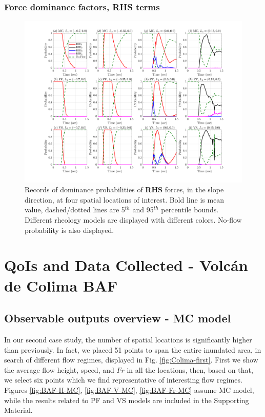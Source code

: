 \documentclass{article}
\begin{document}
\subsubsection{Force dominance factors, RHS terms}\label{stat1}
\begin{figure}[H]
         \centering
        \includegraphics[width=1\textwidth]{NewTest/Pr_x.png}
        \caption{Records of dominance probabilities of \textbf{RHS} forces, in the slope direction, at four spatial locations of interest. Bold line is mean value, dashed/dotted lines are 5$^{th}$ and 95$^{th}$ percentile bounds. Different rheology models are displayed with different colors. No-flow probability is also displayed.}
        \label{fig:Pr_x}
\end{figure}

\section{QoIs and Data Collected - Volc{\'a}n de Colima BAF}\label{QoI2}
\subsection{Observable outputs overview - MC model}
In our second case study, the number of spatial locations is significantly higher than previously. In fact, we placed 51 points to span the entire inundated area, in search of different flow regimes, displayed in Fig. \ref{fig:Colima-first}. First we show the average flow height, speed, and $Fr$ in all the locations, then, based on that, we select six points which we find representative of interesting flow regimes. Figures \ref{fig:BAF-H-MC}, \ref{fig:BAF-V-MC}, \ref{fig:BAF-Fr-MC} assume MC model, while the results related to PF and VS models are included in the Supporting Material.
\end{document}
